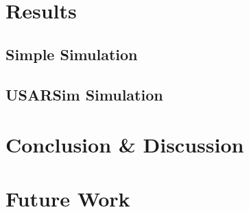 \documentclass[11pt]{article}
\begin{document}



\section{Results}
\label{sec:results}


\subsection{Simple Simulation}

\subsection{USARSim Simulation}




\section{Conclusion \& Discussion}
\label{sec:conclusion}



\section{Future Work}
\label{sec:future}





\end{document}
